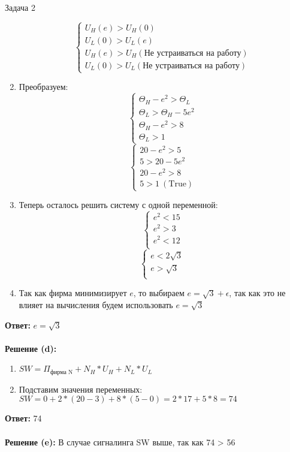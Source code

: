 \begin{mybox}{Задача 2}
\begin{enumerate}
$$\begin{cases}
        U_H(e)>U_H(0) \\
        U_L(0)>U_L(e) \\
        U_H(e)>U_H(\text{Не устраиваться на работу}) \\
        U_L(0)>U_L(\text{Не устраиваться на работу})
    \end{cases}$$
    \item Преобразуем: $$\begin{cases}
        \Theta_H-e^2>\Theta_L \\
        \Theta_L>\Theta_H-5e^2 \\
        \Theta_H-e^2>8 \\
        \Theta_L>1
    \end{cases}$$
    $$\begin{cases}
        20-e^2>5 \\
        5>20-5e^2 \\
        20-e^2>8 \\
        5>1 \ (\text{True})
    \end{cases}$$
    \item Теперь осталось решить систему с одной переменной: $$\begin{cases}
        e^2<15 \\
        e^2>3 \\
        e^2<12 \\
    \end{cases}$$
    $$\begin{cases}
        e<2\sqrt{3} \\
        e>\sqrt{3} \\
    \end{cases}$$
    \item Так как фирма минимизирует $e$, то выбираем $e=\sqrt{3}+\epsilon$, так как это не влияет на вычисления будем использовать $e=\sqrt{3}$
\end{enumerate}
\textbf{Ответ:} $e=\sqrt{3}$\\\\
\textbf{Решение (d):}
\begin{enumerate}
    \item $SW=\Pi_{\text{фирма N}}+N_H*U_H+N_L*U_L$
    \item Подставим значения переменных: $SW=0+2*(20-3)+8*(5-0)=2*17+5*8=74$
\end{enumerate}
\textbf{Ответ:} 74\\\\
\textbf{Решение (e):}
В случае сигналинга SW выше, так как 74 > 56

\end{mybox}
